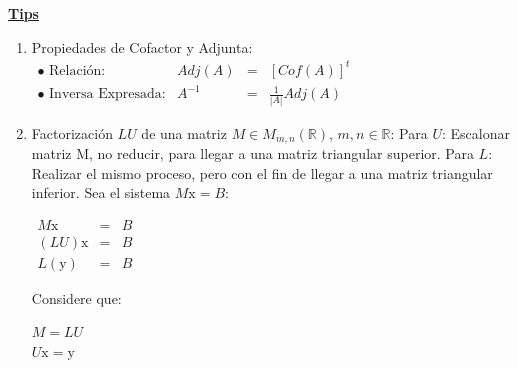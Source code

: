 \documentclass[12pt]{article}
\begin{document}
\begin{enumerate}
          \pagebreak
          \begin{center}
              \textbf{\underline{Tips}}
          \end{center}
          \begin{enumerate}
              \item Propiedades de Cofactor y Adjunta:
                    \subitem
                    $\begin{array}{lrcl}
                            {\bullet}\mbox{ Relaci\'on:}        & Adj(A) & = & [Cof(A)]^t          \\
                            {\bullet}\mbox{ Inversa Expresada:} & A^{-1} & = & \frac{1}{|A|}Adj(A)
                        \end{array}$
              \item Factorizaci\'on $LU$ de una matriz $M \in M_{m,n}(\mathbb{R})$, $m, n \in \mathbb{R}$:
                    \subitem{$\bullet$} Para $U$: Escalonar matriz M, no reducir, para llegar a una matriz triangular superior.
                    \subitem{$\bullet$} Para $L$: Realizar el mismo proceso, pero con el fin de llegar a una matriz triangular inferior.
                    \subitem{$\bullet$} Sea el sistema $M\mbox{x}=B$:
                    \begin{center}
                        $\begin{array}{rcr}
                                M\mbox{x}    & = & B \\
                                (LU)\mbox{x} & = & B \\
                                L(\mbox{y})  & = & B
                            \end{array}$
                    \end{center}
                    \subitem{$\bullet$} Considere que:
                    \begin{center}
                        $M=LU$\\
                        $U\mbox{x}=\mbox{y}$
                    \end{center}
          \end{enumerate}

\end{enumerate}
\end{document}
